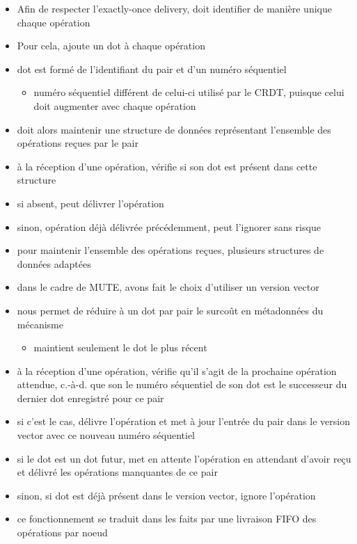 \documentclass[12pt]{thesul}
\newcommand{\ie}{c.-à-d. }
\begin{document}
\begin{itemize}
  \item Afin de respecter l'exactly-once delivery, doit identifier de manière unique chaque opération
  \item Pour cela, ajoute un dot à chaque opération
  \item dot est formé de l'identifiant du pair et d'un numéro séquentiel
  \begin{itemize}
    \item numéro séquentiel différent de celui-ci utilisé par le CRDT, puisque celui doit augmenter avec chaque opération
  \end{itemize}
  \item doit alors maintenir une structure de données représentant l'ensemble des opérations reçues par le pair
  \item à la réception d'une opération, vérifie si son dot est présent dans cette structure
  \item si absent, peut délivrer l'opération
  \item sinon, opération déjà délivrée précédemment, peut l'ignorer sans risque
  \item pour maintenir l'ensemble des opérations reçues, plusieurs structures de données adaptées
  \item dans le cadre de MUTE, avons fait le choix d'utiliser un version vector
  \item nous permet de réduire à un dot par pair le surcoût en métadonnées du mécanisme
  \begin{itemize}
    \item maintient seulement le dot le plus récent
  \end{itemize}
  \item à la réception d'une opération, vérifie qu'il s'agit de la prochaine opération attendue, \ie que son le numéro séquentiel de son dot est le successeur du dernier dot enregistré pour ce pair
  \item si c'est le cas, délivre l'opération et met à jour l'entrée du pair dans le version vector avec ce nouveau numéro séquentiel
  \item si le dot est un dot futur, met en attente l'opération en attendant d'avoir reçu et délivré les opérations manquantes de ce pair
  \item sinon, si dot est déjà présent dans le version vector, ignore l'opération
  \item ce fonctionnement se traduit dans les faits par une livraison FIFO des opérations par noeud

\end{itemize}
\end{document}
